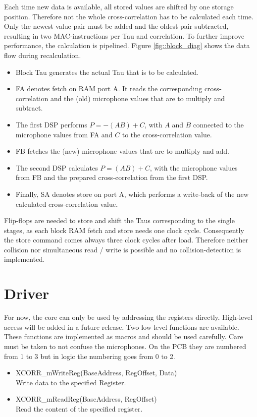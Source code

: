 Each time new data is available, all stored values are shifted by one storage position.
Therefore not the whole cross-correlation has to be calculated each time.
Only the newest value pair must be added and the oldest pair subtracted, resulting in two MAC-instructions per Tau and correlation.
To further improve performance, the calculation is pipelined.
Figure \ref{fig::block_diag} shows the data flow during recalculation.

\begin{itemize}
	\item Block Tau generates the actual Tau that is to be calculated.
	\item FA denotes fetch on RAM port A. It reads the corresponding cross-correlation and the (old) 	microphone values that are to multiply and subtract.	
	\item The first DSP performs $P = -(AB)+C$, with $A$ and $B$ connected to the microphone values from FA and $C$ to the cross-correlation value.
	\item FB fetches the (new) microphone values that are to multiply and add.
	\item The second DSP calculates $P = (AB)+C$, with the microphone values from FB and the prepared cross-correlation from the first DSP.
	\item Finally, SA denotes store on port A, which performs a write-back of the new calculated cross-correlation value.
\end{itemize}

Flip-flops are needed to store and shift the Taus corresponding to the single stages, as each block RAM fetch and store needs one clock cycle.
Consequently the store command comes always three clock cycles after load.
Therefore neither collision nor simultaneous read / write is possible and no collision-detection is implemented.

\section{Driver}
\label{sec::driver}

For now, the core can only be used by addressing the registers directly.
High-level access will be added in a future release.
Two low-level functions are available.
These functions are implemented as macros and should be used carefully.
Care must be taken to not confuse the microphones. 
On the PCB they are numbered from 1 to 3 but in logic the numbering goes from 0 to 2.

\begin{itemize}
	\item XCORR\_mWriteReg(BaseAddress, RegOffset, Data) \\
		Write data to the specified Register. 
	\item XCORR\_mReadReg(BaseAddress, RegOffset) \\		
		Read the content of the specified register.
\end{itemize}

